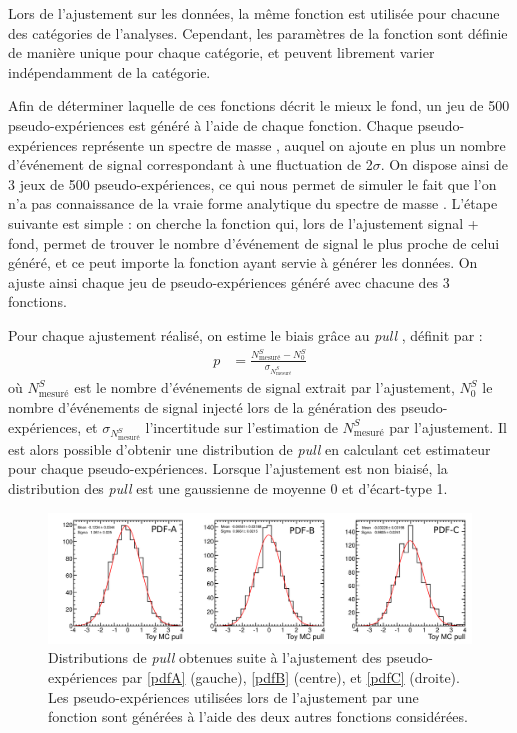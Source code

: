 Lors de l'ajustement sur les données, la même fonction est utilisée pour chacune des catégories de l'analyses. Cependant, les paramètres de la fonction sont définie de manière unique pour chaque catégorie, et peuvent librement varier indépendamment de la catégorie.

Afin de déterminer laquelle de ces fonctions décrit le mieux le fond, un jeu de 500 pseudo-expériences est généré à l'aide de chaque fonction. Chaque pseudo-expériences représente un spectre de masse \ttbar, auquel on ajoute en plus un nombre d'événement de signal correspondant à une fluctuation de 2$\sigma$. On dispose ainsi de 3 jeux de 500 pseudo-expériences, ce qui nous permet de simuler le fait que l'on n'a pas connaissance de la vraie forme analytique du spectre de masse \ttbar. L'étape suivante est simple : on cherche la fonction qui, lors de l'ajustement signal + fond, permet de trouver le nombre d'événement de signal le plus proche de celui généré, et ce peut importe la fonction ayant servie à générer les données. On ajuste ainsi chaque jeu de pseudo-expériences généré avec chacune des 3 fonctions.

Pour chaque ajustement réalisé, on estime le biais grâce au \emph{pull} \citep{pulls}, définit par :
\begin{align*}
  p &= \frac{N^S_\text{mesuré} - N^S_{0}}{\sigma_{N^S_\text{mesuré}}}
\end{align*}
où $N^S_\text{mesuré}$ est le nombre d'événements de signal extrait par l'ajustement, $N^S_{0}$ le nombre d'événements de signal injecté lors de la génération des pseudo-expériences, et $\sigma_{N^S_\text{mesuré}}$ l'incertitude sur l'estimation de $N^S_\text{mesuré}$ par l'ajustement. Il est alors possible d'obtenir une distribution de \emph{pull} en calculant cet estimateur pour chaque pseudo-expériences. Lorsque l'ajustement est non biaisé, la distribution des \emph{pull} est une gaussienne de moyenne 0 et d'écart-type 1.

\begin{figure}[tbp]
  \centering
  \includegraphics[width=\textwidth]{chapitre7/figs/alterfit_750.pdf}
  \caption{Distributions de \emph{pull} obtenues suite à l'ajustement des pseudo-expériences par \ref{pdfA} (gauche), \ref{pdfB} (centre), et \ref{pdfC} (droite). Les pseudo-expériences utilisées lors de l'ajustement par une fonction sont générées à l'aide des deux autres fonctions considérées.}
  \label{fig:pulls}
\end{figure}

